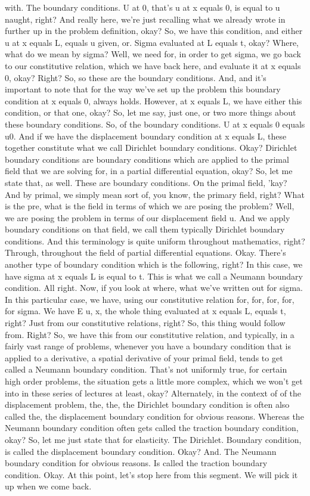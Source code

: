 \documentclass[10pt]{article}
\begin{document}
with. The boundary conditions. U at 0, that's u at x equals 0, is equal to u naught, right? And really here, we're just recalling what we already wrote in further up in the problem definition, okay? So, we have this condition, and either u at x equals L, equals u given, or. Sigma evaluated at L equals t, okay? Where, what do we mean by sigma? Well, we need for, in order to get sigma, we go back to our constitutive relation, which we have back here, and evaluate it at x equals 0, okay? Right? So, so these are the boundary conditions. And, and it's important to note that for the way we've set up the problem this boundary condition at x equals 0, always holds. However, at x equals L, we have either this condition, or that one, okay? So, let me say, just one, or two more things about these boundary conditions. So, of the boundary conditions. U at x equals 0 equals u0. And if we have the displacement boundary condition at x equals L, these together constitute what we call Dirichlet boundary conditions. Okay? Dirichlet boundary conditions are boundary conditions which are applied to the primal field that we are solving for, in a partial differential equation, okay? So, let me state that, as well. These are boundary conditions. On the primal field, 'kay? And by primal, we simply mean sort of, you know, the primary field, right? What is the pre, what is the field in terms of which we are posing the problem? Well, we are posing the problem in terms of our displacement field u. And we apply boundary conditions on that field, we call them typically Dirichlet boundary conditions. And this terminology is quite uniform throughout mathematics, right? Through, throughout the field of partial differential equations. Okay. There's another type of boundary condition which is the following, right? In this case, we have sigma at x equals L is equal to t. This is what we call a Neumann boundary condition. All right. Now, if you look at where, what we've written out for sigma. In this particular case, we have, using our constitutive relation for, for, for, for, for sigma. We have E u, x, the whole thing evaluated at x equals L, equals t, right? Just from our constitutive relations, right? So, this thing would follow from. Right? So, we have this from our constitutive relation, and typically, in a fairly vast range of problems, whenever you have a boundary condition that is applied to a derivative, a spatial derivative of your primal field, tends to get called a Neumann boundary condition. That's not uniformly true, for certain high order problems, the situation gets a little more complex, which we won't get into in these series of lectures at least, okay? Alternately, in the context of of the displacement problem, the, the, the Dirichlet boundary condition is often also called the, the displacement boundary condition for obvious reasons. Whereas the Neumann boundary condition often gets called the traction boundary condition, okay? So, let me just state that for elasticity. The Dirichlet. Boundary condition, is called the displacement boundary condition. Okay? And. The Neumann boundary condition for obvious reasons. Is called the traction boundary condition. Okay. At this point, let's stop here from this segment. We will pick it up when we come back.
\end{document}

